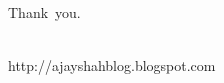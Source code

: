 \documentclass{beamer}
\begin{document}
\begin{frame}
  \hfill\mbox{\large Thank you.} 

  ~\\

  \hfill\mbox{\large http://ajayshahblog.blogspot.com}

\end{frame}
\end{document}

